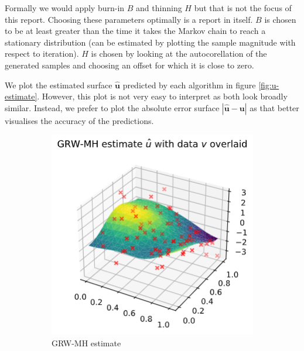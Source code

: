 \documentclass[]{article}
\newcommand{\ubold}{\boldsymbol{u}}
\begin{document}
Formally we would apply burn-in $B$ and thinning $H$ but that is not the focus of this report. Choosing these parameters optimally is a report in itself. $B$ is chosen to be at least greater than the time it takes the Markov chain to reach a stationary distribution (can be estimated by plotting the sample magnitude with respect to iteration). $H$ is chosen by looking at the autocorellation of the generated samples and choosing an offset for which it is close to zero.

We plot the estimated surface $\hat{\ubold}$ predicted by each algorithm in figure \ref{fig:u-estimate}. However, this plot is not very easy to interpret as both look broadly similar. Instead, we prefer to plot the absolute error surface $|\hat{\ubold} - \ubold|$ as that better visualises the accuracy of the predictions.
%
\begin{figure}[!h]
	\centering
	\begin{subfigure}{0.32\linewidth}
		\includegraphics[width=\linewidth]{grw-mh-estimate.png}
		\caption{GRW-MH estimate}
		\label{fig:grw-estimate}
	\end{subfigure}
	\begin{subfigure}{0.31\linewidth}

\end{subfigure}
\end{figure}
\end{document}
